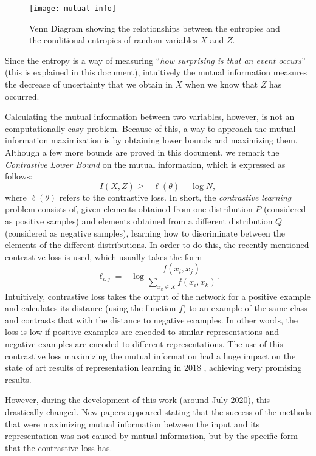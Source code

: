 \begin{figure}[H]
    \centering
    \texttt{[image: mutual-info]}
    \caption{Venn Diagram showing the relationships between the entropies and the conditional entropies of random variables $X$ and $Z$.}
\end{figure}

Since the entropy is a way of measuring ``\emph{how surprising is that an event occurs}'' (this is explained in this document), intuitively the mutual information measures the decrease of uncertainty that we obtain in $X$ when we know that $Z$ has occurred.

Calculating the mutual information between two variables, however, is not an computationally easy problem. Because of this, a way to approach the mutual information maximization is by obtaining lower bounds and maximizing them. Although a few more bounds are proved in this document, we remark the \emph{Contrastive Lower Bound} on the mutual information, which is expressed as follows:
\[
I(X,Z)  \geq - \ell(\theta) + \log N,
\]
where $\ell(\theta)$ refers to the contrastive loss. In short, the \emph{contrastive learning} problem consists of, given elements obtained from one distribution $P$ (considered as positive samples) and elements obtained from a different distribution $Q$ (considered as negative samples), learning how to discriminate between the elements of the different distributions. In order to do this, the recently mentioned contrastive loss is used, which usually takes the form
\[
\ell_{i,j} = -  \log \frac{f(x_i,x_j)}{\sum_{x_k \in X}f(x_i,x_k)}.
\] 
Intuitively, contrastive loss takes the output of the network for a positive example and calculates its distance (using the function $f$) to an example of the same class and contrasts that with the distance to negative examples. In other words, the loss is low if positive examples are encoded to similar representations and negative examples are encoded to different representations. The use of this contrastive loss maximizing the mutual information had a huge impact on the state of art results of representation learning in 2018 \citep{oord_representation_2019}, achieving very promising results.

However, during the development of this work (around July 2020), this drastically changed. New papers  \citep{chen_simple_2020, grill2020bootstrap} appeared stating that the success of the methods that were maximizing mutual information between the input and its representation was not caused by mutual information, but by the specific form that the contrastive loss has.

